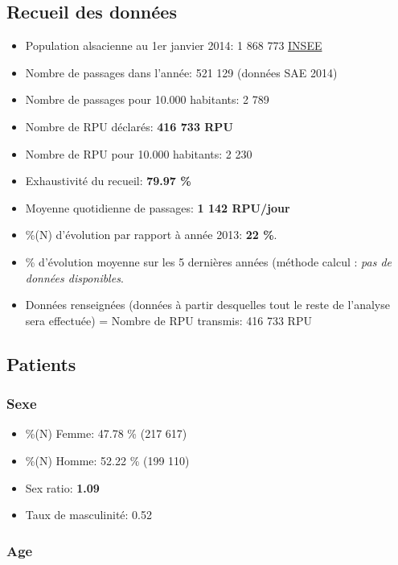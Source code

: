 \documentclass[]{article}
\begin{document}
\subsection{Recueil des données}\label{recueil-des-donnees}

\begin{itemize}
\itemsep1pt\parskip0pt
\item
  Population alsacienne au 1er janvier 2014: 1 868 773 \href{}{INSEE}
\item
  Nombre de passages dans l'année: 521 129 (données SAE 2014)
\item
  Nombre de passages pour 10.000 habitants: 2 789
\item
  Nombre de RPU déclarés: \textbf{416 733 RPU}
\item
  Nombre de RPU pour 10.000 habitants: 2 230
\item
  Exhaustivité du recueil: \textbf{79.97 \%}
\item
  Moyenne quotidienne de passages: \textbf{1 142 RPU/jour}
\item
  \%(N) d'évolution par rapport à année 2013: \textbf{22 \%}.
\item
  \% d'évolution moyenne sur les 5 dernières années (méthode calcul :
  \emph{pas de données disponibles}.
\item
  Données renseignées (données à partir desquelles tout le reste de
  l'analyse sera effectuée) = Nombre de RPU transmis: 416 733 RPU
\end{itemize}

\subsection{Patients}\label{patients}

\subsubsection{Sexe}\label{sexe}

\begin{itemize}
\itemsep1pt\parskip0pt
\item
  \%(N) Femme: 47.78 \% (217 617)
\item
  \%(N) Homme: 52.22 \% (199 110)
\item
  Sex ratio: \textbf{1.09}
\item
  Taux de masculinité: 0.52
\end{itemize}

\subsubsection{Age}\label{age}
\end{document}
